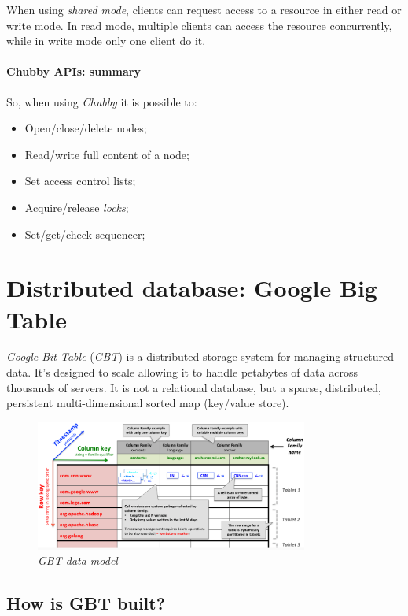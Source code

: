 \noindent
When using \emph{shared mode}, clients can request access to a resource in either
read or write mode. In read mode, multiple clients can access the resource
concurrently, while in write mode only one client do it.

\paragraph{Chubby APIs: summary}
So, when using \emph{Chubby} it is possible to:
\begin{itemize}
    \item Open/close/delete nodes;
    \item Read/write full content of a node;
    \item Set access control lists;
    \item Acquire/release \emph{locks};
    \item Set/get/check sequencer;
\end{itemize}

\section{Distributed database: Google Big Table}
\emph{Google Bit Table} (\emph{GBT}) is a distributed storage system for
managing structured data. It's designed to scale allowing it to handle petabytes
of data across thousands of servers. It is not a relational database, but a
sparse, distributed, persistent multi-dimensional sorted map (key/value store).

\begin{figure}[h!]
    \centering
    \includegraphics[width=0.8\textwidth]{images/gbt-design.png}
    \caption{\emph{GBT data model}}
\end{figure}

\subsection{How is GBT built?}


